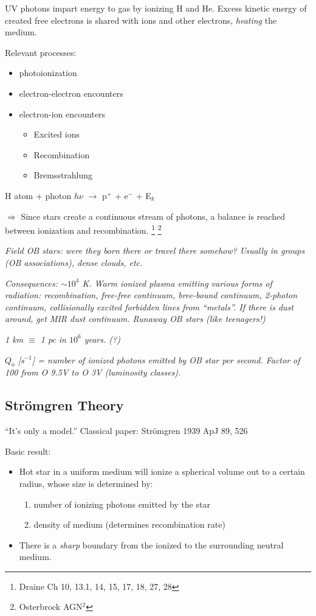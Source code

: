 \documentclass[11pt]{article}
\newcommand{\mar}[1]{\hspace{0pt}\marginpar{-\textcolor{black}{#1}-}}
\newcommand{\mynotes}[1]{{\fontfamily{cmss}\selectfont \textit{#1}}}
\begin{document}
UV photons impart energy to gas by ionizing H and He. Excess kinetic energy
of created free electrons is shared with ions and other electrons,
\emph{heating} the medium.

Relevant processes:
\begin{itemize}
    \item photoionization
    \item electron-electron encounters
    \item electron-ion encounters
        \begin{itemize}
            \item Excited ions
            \item Recombination
            \item Bremsstrahlung
        \end{itemize}
\end{itemize}
H atom + photon $h\nu$ $\longrightarrow$ p$^{+}$ + e$^{-}$ + E$_{k}$

\textcolor{bred}{$\Longrightarrow$}
{Since stars create a continuous stream of photons, a
balance is reached between ionization and recombination.}
\footnote{Draine Ch 10, 13.1, 14, 15, 17, 18, 27, 28}
\footnote{Osterbrock AGN$^{2}$}

\mynotes{Field OB stars: were they born there or travel there somehow? Usually
in groups (OB associations), dense clouds, etc.}

\mynotes{Consequences: $\sim 10^{4}$ K. Warm ionized plasma emitting various forms
of radiation: recombination, free-free continuum, bree-bound continuum,
2-photon continuum, collisionally excited forbidden lines from ``metals''.
If there is dust around, get MIR dust continuum. Runaway OB stars (like
teenagers!)}

\mynotes{1 km $\equiv$ 1 pc in $10^{6}$ years. (?)}

\mynotes{$Q_{o}$ [s$^{-1}$]
= number of ionized photons emitted by OB star per second.
Factor of 100 from O 9.5V to O 3V (luminosity classes).}

\subsection{Str\"{o}mgren Theory}
\mar{52}``It's only a model.''
Classical paper:%
{Str\"{o}mgren 1939 ApJ 89, 526}

Basic result:
\begin{itemize}
    \item Hot star in a uniform medium will ionize a spherical volume
        out to a certain radius, whose size is determined by:
        \begin{enumerate}
            \item number of ionizing photons emitted by the star
            \item density of medium (determines recombination rate)
        \end{enumerate}
    \item There is a \emph{sharp} boundary from the ionized to the
        surrounding neutral medium.
\end{itemize}
\end{document}
